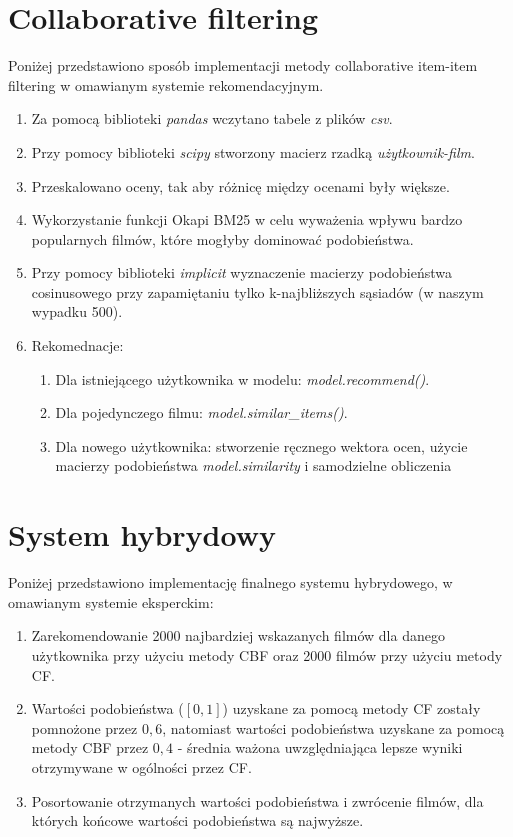 \documentclass{article}
\begin{document}
\section{Collaborative filtering}
Poniżej przedstawiono sposób implementacji metody collaborative item-item filtering w omawianym systemie rekomendacyjnym.
\begin{enumerate}
    \item Za pomocą biblioteki \textit{pandas} wczytano tabele z plików \textit{csv}. 
    \item Przy pomocy biblioteki \textit{scipy} stworzony macierz rzadką \textit{użytkownik-film}.
    \item Przeskalowano oceny, tak aby różnicę między ocenami były większe.
    \item Wykorzystanie funkcji Okapi BM25 w celu wyważenia wpływu bardzo popularnych filmów, które mogłyby dominować podobieństwa.
    \item Przy pomocy biblioteki \textit{implicit} wyznaczenie macierzy podobieństwa cosinusowego przy zapamiętaniu tylko k-najbliższych sąsiadów (w naszym wypadku 500).
    \item Rekomednacje:
    \begin{enumerate}
        \item Dla istniejącego użytkownika w modelu: \textit{model.recommend()}.
        \item Dla pojedynczego filmu: \textit{model.similar\_items()}.
        \item Dla nowego użytkownika: stworzenie ręcznego wektora ocen, użycie macierzy podobieństwa \textit{model.similarity} i samodzielne obliczenia
    \end{enumerate}
\end{enumerate}
\section{System hybrydowy}
Poniżej przedstawiono implementację finalnego systemu hybrydowego, w omawianym systemie eksperckim:
\begin{enumerate}
    \item Zarekomendowanie 2000 najbardziej wskazanych filmów dla danego użytkownika przy użyciu metody CBF oraz 2000 filmów przy użyciu metody CF.
    \item Wartości podobieństwa ($[0,1]$) uzyskane za pomocą metody CF zostały pomnożone przez $0,6$, natomiast wartości podobieństwa uzyskane za pomocą metody CBF przez $0,4$ - średnia ważona uwzględniająca lepsze wyniki otrzymywane w ogólności przez CF.
    \item Posortowanie otrzymanych wartości podobieństwa i zwrócenie filmów, dla których końcowe wartości podobieństwa są najwyższe.
\end{enumerate}
\end{document}
